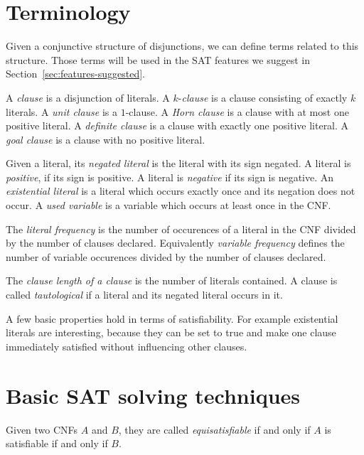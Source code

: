 \section{Terminology}
\label{sec:sat-terminology}
%
Given a conjunctive structure of disjunctions, we can define terms
related to this structure. Those terms will be used in the SAT features
we suggest in Section~\ref{sec:features-suggested}.

\begin{defi}
  A \emph{clause} is a disjunction of literals.
  A $k$-\emph{clause} is a clause consisting of exactly $k$ literals.
  A \emph{unit clause} is a $1$-clause.
  A \emph{Horn clause} is a clause with at most one positive literal.
  A \emph{definite clause} is a clause with exactly one positive literal.
  A \emph{goal clause} is a clause with no positive literal.
\end{defi}

\begin{defi}
  Given a literal, its \emph{negated literal} is the literal with its sign negated.
  A literal is \emph{positive}, if its sign is positive. A literal is \emph{negative} if its sign is negative.
  An \emph{existential literal} is a literal which occurs exactly once and
  its negation does not occur. A \emph{used variable} is a variable which
  occurs at least once in the CNF.

  The \emph{literal frequency} is the number of occurences of a literal in the CNF divided by the number of clauses declared.
  Equivalently \emph{variable frequency} defines the number of variable occurences divided by the number of clauses declared.
\end{defi}

\begin{defi}
  The \emph{clause length of a clause} is the number of literals contained.
  A clause is called \emph{tautological} if a literal and its negated literal occurs in it.
\end{defi}

A few basic properties hold in terms of satisfiability. For example existential literals
are interesting, because they can be set to true and make one clause immediately satisfied
without influencing other clauses.

\section{Basic SAT solving techniques}
\label{sec:sat-solving}
%
\begin{defi}
  Given two CNFs $A$ and $B$, they are called \emph{equisatisfiable} if and only
  if $A$ is satisfiable if and only if $B$.
\end{defi}

